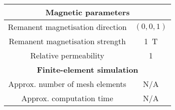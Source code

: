 \begin{table}[h!]
    \centering
    \begin{tabular}{c|c}
        \multicolumn{2}{c}{\textbf{Magnetic parameters}} \\ \hline
        Remanent magnetisation direction & \(\left(0,0,1\right)\) \\
        Remanent magnetisation strength & \SI{1}{\tesla} \\
        Relative permeability & 1 \\ \hline\hline
        \multicolumn{2}{c}{\textbf{Finite-element simulation}} \\ \hline
        Approx. number of mesh elements & N/A \\
        Approx. computation time & N/A \\ \hline\hline
    \end{tabular}
\end{table}

\newpage
